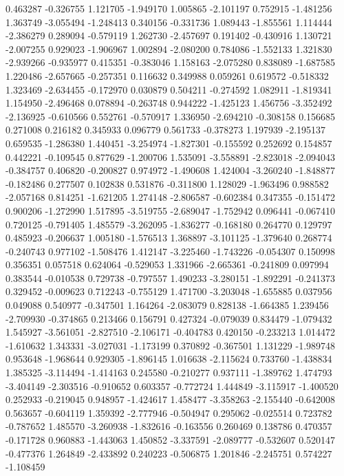 0.463287
-0.326755
1.121705
-1.949170
1.005865
-2.101197
0.752915
-1.481256
1.363749
-3.055494
-1.248413
0.340156
-0.331736
1.089443
-1.855561
1.114444
-2.386279
0.289094
-0.579119
1.262730
-2.457697
0.191402
-0.430916
1.130721
-2.007255
0.929023
-1.906967
1.002894
-2.080200
0.784086
-1.552133
1.321830
-2.939266
-0.935977
0.415351
-0.383046
1.158163
-2.075280
0.838089
-1.687585
1.220486
-2.657665
-0.257351
0.116632
0.349988
0.059261
0.619572
-0.518332
1.323469
-2.634455
-0.172970
0.030879
0.504211
-0.274592
1.082911
-1.819341
1.154950
-2.496468
0.078894
-0.263748
0.944222
-1.425123
1.456756
-3.352492
-2.136925
-0.610566
0.552761
-0.570917
1.336950
-2.694210
-0.308158
0.156685
0.271008
0.216182
0.345933
0.096779
0.561733
-0.378273
1.197939
-2.195137
0.659535
-1.286380
1.440451
-3.254974
-1.827301
-0.155592
0.252692
0.154857
0.442221
-0.109545
0.877629
-1.200706
1.535091
-3.558891
-2.823018
-2.094043
-0.384757
0.406820
-0.200827
0.974972
-1.490608
1.424004
-3.260240
-1.848877
-0.182486
0.277507
0.102838
0.531876
-0.311800
1.128029
-1.963496
0.988582
-2.057168
0.814251
-1.621205
1.274148
-2.806587
-0.602384
0.347355
-0.151472
0.900206
-1.272990
1.517895
-3.519755
-2.689047
-1.752942
0.096441
-0.067410
0.720125
-0.791405
1.485579
-3.262095
-1.836277
-0.168180
0.264770
0.129797
0.485923
-0.206637
1.005180
-1.576513
1.368897
-3.101125
-1.379640
0.268774
-0.240743
0.977102
-1.508476
1.412147
-3.225460
-1.743226
-0.054307
0.150998
0.356351
0.057518
0.624064
-0.529053
1.331966
-2.665361
-0.241809
0.097994
0.383544
-0.010538
0.729738
-0.797557
1.490233
-3.280151
-1.892291
-0.241373
0.329452
-0.009623
0.712243
-0.755129
1.471700
-3.203048
-1.655885
0.037956
0.049088
0.540977
-0.347501
1.164264
-2.083079
0.828138
-1.664385
1.239456
-2.709930
-0.374865
0.213466
0.156791
0.427324
-0.079039
0.834479
-1.079432
1.545927
-3.561051
-2.827510
-2.106171
-0.404783
0.420150
-0.233213
1.014472
-1.610632
1.343331
-3.027031
-1.173199
0.370892
-0.367501
1.131229
-1.989748
0.953648
-1.968644
0.929305
-1.896145
1.016638
-2.115624
0.733760
-1.438834
1.385325
-3.114494
-1.414163
0.245580
-0.210277
0.937111
-1.389762
1.474793
-3.404149
-2.303516
-0.910652
0.603357
-0.772724
1.444849
-3.115917
-1.400520
0.252933
-0.219045
0.948957
-1.424617
1.458477
-3.358263
-2.155440
-0.642008
0.563657
-0.604119
1.359392
-2.777946
-0.504947
0.295062
-0.025514
0.723782
-0.787652
1.485570
-3.260938
-1.832616
-0.163556
0.260469
0.138786
0.470357
-0.171728
0.960883
-1.443063
1.450852
-3.337591
-2.089777
-0.532607
0.520147
-0.477376
1.264849
-2.433892
0.240223
-0.506875
1.201846
-2.245751
0.574227
-1.108459
